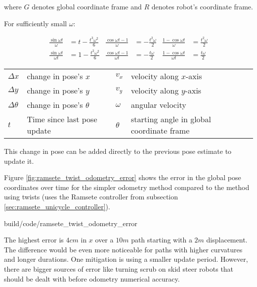 \begin{theorem}
  where $G$ denotes global coordinate frame and $R$ denotes robot's coordinate
  frame.

  For sufficiently small $\omega$:

  \begin{align}
    \frac{\sin\omega t}{\omega} &= t - \frac{t^3 \omega^2}{6} &
    \frac{\cos\omega t - 1}{\omega} &= -\frac{t^2 \omega}{2} &
    \frac{1 - \cos\omega t}{\omega} &= \frac{t^2 \omega}{2} \\
    \frac{\sin\omega t}{\omega t} &= 1 - \frac{t^2 \omega^2}{6} &
    \frac{\cos\omega t - 1}{\omega t} &= -\frac{t \omega}{2} &
    \frac{1 - \cos\omega t}{\omega t} &= \frac{t \omega}{2}
  \end{align}

  \begin{figurekey}
    \begin{tabular}{llll}
      $\Delta x$ & change in pose's $x$ & $v_x$ & velocity along $x$-axis \\
      $\Delta y$ & change in pose's $y$ & $v_y$ & velocity along $y$-axis \\
      $\Delta \theta$ & change in pose's $\theta$ & $\omega$ & angular velocity
        \\
      $t$ & Time since last pose update & $\theta$ & starting angle in global
        coordinate frame
    \end{tabular}
  \end{figurekey}

  This change in pose can be added directly to the previous pose estimate to
  update it.
\end{theorem}

Figure \ref{fig:ramsete_twist_odometry_error} shows the error in the global pose
coordinates over time for the simpler odometry method compared to the method
using twists (uses the Ramsete controller from subsection
\ref{sec:ramsete_unicycle_controller}).

\begin{svg}{build/code/ramsete_twist_odometry_error}
  \caption{Odometry error compared to method using twists ($dt = 0.05s$)}
  \label{fig:ramsete_twist_odometry_error}
\end{svg}

The highest error is $4cm$ in $x$ over a $10m$ path starting with a $2m$
displacement. The difference would be even more noticeable for paths with higher
curvatures and longer durations. One mitigation is using a smaller update
period. However, there are bigger sources of error like turning scrub on skid
steer robots that should be dealt with before odometry numerical accuracy.
